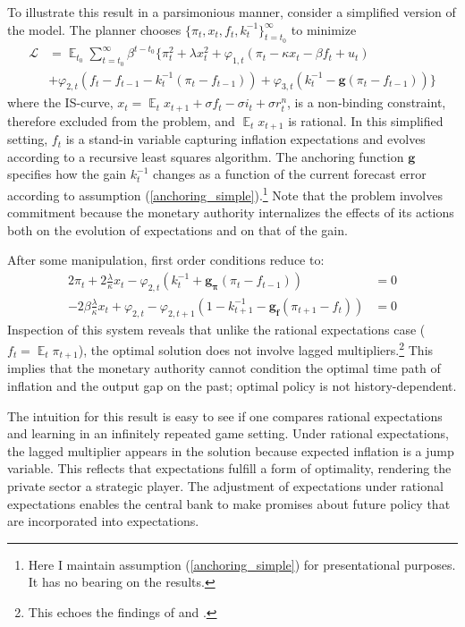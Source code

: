 \documentclass[11pt]{article}
\renewcommand{\[}{\begin{equation}}
\renewcommand{\]}{\end{equation}}
\DeclareMathOperator{\E}{\mathbb{E}}
\begin{document}
To illustrate this result in a parsimonious manner, consider a simplified version of the model. The planner chooses $\{\pi_t, x_t, f_t, k_t^{-1}\}_{t=t_0}^{\infty}$ to minimize
 \begin{align*}
\mathcal{L} &= \E_{t_0}\sum_{t=t_0}^{\infty} \beta^{t-t_0}\bigg\{ \pi_t^2  + \lambda x_t^2 + \varphi_{1,t} (\pi_t -\kappa x_t- \beta f_t +u_t) \\ &+ \varphi_{2,t}(f_t - f_{t-1} -k_t^{-1}(\pi_t - f_{t-1})) + \varphi_{3,t}(k_t^{-1} - \mathbf{g}(\pi_t - f_{t-1})) \bigg\}
 \end{align*}
 where the IS-curve, $x_t = \E_t x_{t+1}+\sigma f_t -\sigma i_t +\sigma r_t^n$, is a non-binding constraint, therefore excluded from the problem, and $\E_t x_{t+1}$ is rational. In this simplified setting, $f_t$ is a stand-in variable capturing inflation expectations and evolves according to a recursive least squares algorithm. The anchoring function $\mathbf{g}$ specifies how the gain $k_t^{-1}$ changes as a function of the current forecast error according to assumption (\ref{anchoring_simple}).\footnote{Here I maintain assumption (\ref{anchoring_simple}) for presentational purposes. It has no bearing on the results.} Note that the problem involves commitment because the monetary authority internalizes the effects of its actions both on the evolution of expectations and on that of the gain. 
 
 After some manipulation, first order conditions reduce to:
 \begin{align}
  2\pi_t +2\frac{\lambda}{\kappa}x_t -\varphi_{2,t}(k_t^{-1} + \mathbf{g_{\pi}}(\pi_t -f_{t-1}))& = 0 \label{simpleFOC1} \\
  -2\beta\frac{\lambda}{\kappa}x_t + \varphi_{2,t} -\varphi_{2,t+1}(1-k_{t+1}^{-1} -\mathbf{g_{f}}(\pi_{t+1} -f_{t})) & = 0 \label{simpleFOC2} 
 \end{align}
Inspection of this system reveals that unlike the rational expectations case ($f_t = \E_t{\pi_{t+1}}$), the optimal solution does not involve lagged multipliers.\footnote{This echoes the findings of \cite{molnar2014optimal} and \cite{gaspar2010inflation}.} This implies that the monetary authority cannot condition the optimal time path of inflation and the output gap on the past; optimal policy is not history-dependent. 

The intuition for this result is easy to see if one compares rational expectations and learning in an infinitely repeated game setting. Under rational expectations, the lagged multiplier appears in the solution because expected inflation is a jump variable. This reflects that expectations fulfill a form of optimality, rendering the private sector a strategic player. The adjustment of expectations under rational expectations enables the central bank to make promises about future policy that are incorporated into expectations. 
\end{document}
